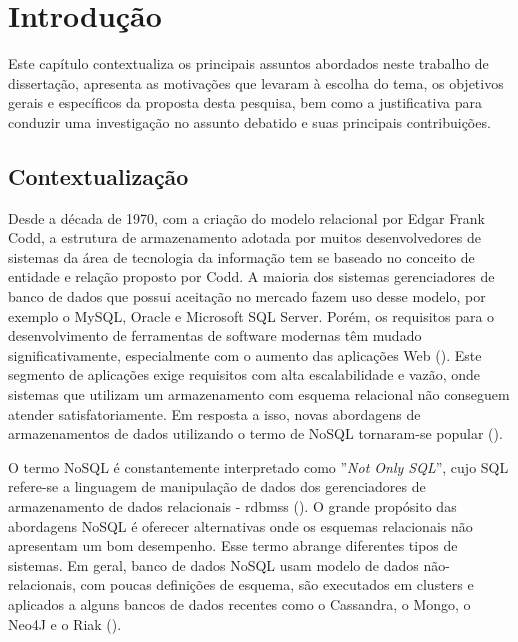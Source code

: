 
\chapter{Introdução}
\label{chp:introduction}


\noindent Este capítulo contextualiza os principais assuntos abordados neste trabalho de dissertação, apresenta as motivações que levaram à escolha do tema, os objetivos gerais e específicos da proposta desta pesquisa, bem como a justificativa para conduzir uma investigação no assunto debatido e suas principais contribuições.
\clearpage


\section{Contextualização}

Desde a década de 1970, com a criação do modelo relacional por Edgar Frank Codd, a estrutura de armazenamento adotada por muitos desenvolvedores de sistemas da área de tecnologia da informação tem se baseado no conceito de entidade e relação proposto por Codd. A maioria dos sistemas gerenciadores de banco de dados que possui aceitação no mercado fazem uso desse modelo, por exemplo o MySQL, Oracle e Microsoft SQL Server. Porém, os requisitos para o desenvolvimento de ferramentas de software modernas têm mudado significativamente, especialmente com o aumento das aplicações Web (\cite{nasholm:2012}). Este segmento de aplicações exige requisitos com alta escalabilidade e vazão, onde sistemas que utilizam um armazenamento com esquema relacional não conseguem atender satisfatoriamente. Em resposta a isso, novas abordagens de armazenamentos de dados utilizando o termo de NoSQL tornaram-se popular (\cite{silva:2016}).

O termo NoSQL é constantemente interpretado como  ''\emph{Not Only SQL}'', cujo SQL refere-se a linguagem de manipulação de dados dos gerenciadores de armazenamento de dados relacionais - \acp{rdbms} (\cite{nasholm:2012}). O grande propósito das abordagens NoSQL é oferecer alternativas onde os esquemas relacionais não apresentam um bom desempenho. Esse termo abrange diferentes tipos de sistemas. Em geral, banco de dados NoSQL usam modelo de dados não-relacionais, com poucas definições de esquema, são executados em clusters e aplicados a alguns bancos de dados recentes como o Cassandra, o Mongo, o Neo4J e o Riak (\cite{fowler:2013}).

